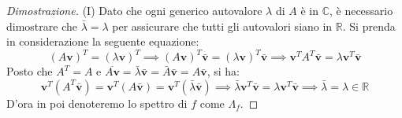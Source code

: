     \begin{proof}[Dimostrazione]
        (I) Dato che ogni generico autovalore $\lambda$ di $A$ è in $\mathbb{C}$, è necessario dimostrare che $\bar{\lambda} = \lambda$ per assicurare che tutti gli autovalori siano in $\mathbb{R}$.
        Si prenda in considerazione la seguente equazione:
        \[
            (A \mathbf{v})^{T} = (\lambda \mathbf{v})^{T} \implies (A \mathbf{v})^{T} \bar{\mathbf{v}} = (\lambda \mathbf{v})^{T} \bar{\mathbf{v}} \implies \mathbf{v}^{T} A^{T} \bar{\mathbf{v}} = \lambda \mathbf{v}^{T} \bar{\mathbf{v}} \tag{1.1}
        \]
        Posto che $A^{T} = A$ e $\overline{A \mathbf{v}} = \bar{\lambda} \bar{\mathbf{v}} = \bar{A} \bar{\mathbf{v}} = A \bar{\mathbf{v}}$, si ha:
        \[
            \mathbf{v}^{T} (A^{T} \bar{\mathbf{v}}) = \mathbf{v}^{T} (A \bar{\mathbf{v}}) = \mathbf{v}^{T} (\bar{\lambda} \bar{\mathbf{v}}) \implies \bar{\lambda} \mathbf{v}^{T} \bar{\mathbf{v}} = \lambda \mathbf{v}^{T} \bar{\mathbf{v}} \implies \bar{\lambda} = \lambda \in \mathbb{R} \tag{1.2}
        \]
        D'ora in poi denoteremo lo spettro di $f$ come $\Lambda_{f}$.


\end{proof}
